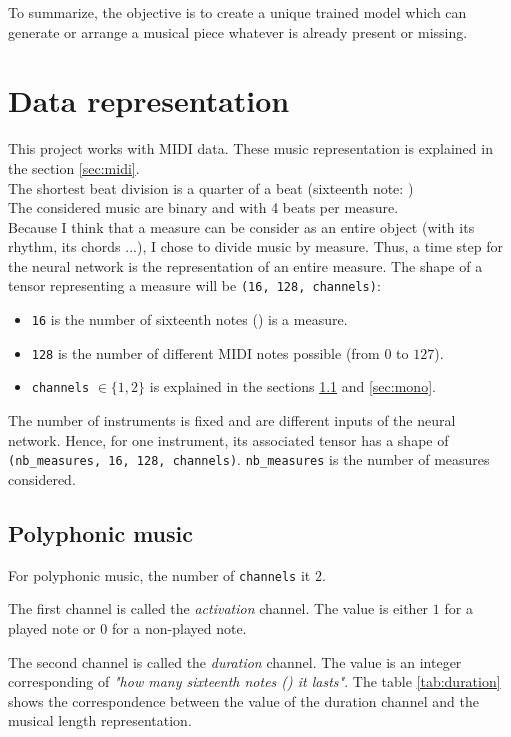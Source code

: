 \documentclass[12pt]{report}
\begin{document}
To summarize, the objective is to create a unique trained model which can generate or arrange a musical piece whatever is already present or missing.

\section{Data representation}
\label{sec:data_represetation}

This project works with MIDI data. These music representation is explained in the section \ref{sec:midi}. \\
The shortest beat division is a quarter of a beat (sixteenth note: \musSixteenth) \\
The considered music are binary and with 4 beats per measure. \\
Because I think that a measure can be consider as an entire object (with its rhythm, its chords ...), I chose to divide music by measure. Thus, a time step for the neural network is the representation of an entire measure.
The shape of a tensor representing a measure will be \texttt{(16, 128, channels)}:
\begin{itemize}
    \item \texttt{16} is the number of sixteenth notes (\musSixteenth) is a measure.
    \item \texttt{128} is the number of different MIDI notes possible (from $0$ to $127$).
    \item \texttt{channels} $\in \{1, 2\}$ is explained in the sections \ref{sec:poly} and \ref{sec:mono}.
\end{itemize}

The number of instruments is fixed and are different inputs of the neural network.
Hence, for one instrument, its associated tensor has a shape of \texttt{(nb\_measures, 16, 128, channels)}. \texttt{nb\_measures} is the number of measures considered.

\subsection{Polyphonic music}
\label{sec:poly}

For polyphonic music, the number of \texttt{channels} it $2$.

The first channel is called the \textit{activation} channel. The value is either $1$ for a played note or $0$ for a non-played note.

The second channel is called the \textit{duration} channel. The value is an integer corresponding of \textit{"how many sixteenth notes (\musSixteenth) it lasts"}.
The table \ref{tab:duration} shows the correspondence between the value of the duration channel and the musical length representation.
\end{document}
